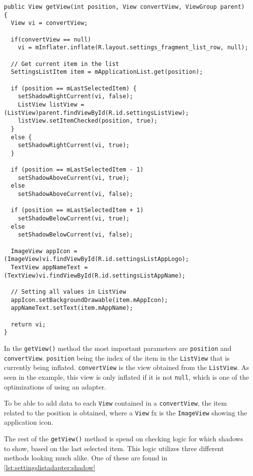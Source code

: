 \begin{lstlisting}[caption={\lstinline|getView()| method in \lstinline|SettingsListAdapter| class.}, label={lst:settingslistadapter:getview}]
public View getView(int position, View convertView, ViewGroup parent) {
  View vi = convertView;
  
  if(convertView == null)
    vi = mInflater.inflate(R.layout.settings_fragment_list_row, null);
  
  // Get current item in the list
  SettingsListItem item = mApplicationList.get(position);
  
  if (position == mLastSelectedItem) {
    setShadowRightCurrent(vi, false);
    ListView listView = (ListView)parent.findViewById(R.id.settingsListView);
    listView.setItemChecked(position, true);
  }
  else {
    setShadowRightCurrent(vi, true);
  }
  
  if (position == mLastSelectedItem - 1)
    setShadowAboveCurrent(vi, true);
  else
    setShadowAboveCurrent(vi, false);
  
  if (position == mLastSelectedItem + 1)
    setShadowBelowCurrent(vi, true);
  else
    setShadowBelowCurrent(vi, false);
  
  ImageView appIcon = (ImageView)vi.findViewById(R.id.settingsListAppLogo);
  TextView appNameText = (TextView)vi.findViewById(R.id.settingsListAppName);
  
  // Setting all values in ListView
  appIcon.setBackgroundDrawable(item.mAppIcon);
  appNameText.setText(item.mAppName);
  
  return vi;
}
\end{lstlisting}

In the \lstinline|getView()| method the most important parameters are \lstinline|position| and \lstinline|convertView|.
\lstinline|position| being the index of the item in the \lstinline|ListView| that is currently being inflated.
\lstinline|convertView| is the view obtained from the \lstinline|ListView|.
As seen in the example, this view is only inflated if it is not \lstinline|null|, which is one of the optimizations of using an adapter.

To be able to add data to each \lstinline|View| contained in a \lstinline|convertView|, the item related to the position is obtained, where a \lstinline|View| fx is the \lstinline|ImageView| showing the application icon.

The rest of the \lstinline|getView()| method is spend on checking logic for which shadows to show, based on the last selected item.
This logic utilizes three different methods looking much alike.
One of these are found in \cref{lst:settingslistadapter:shadow}

